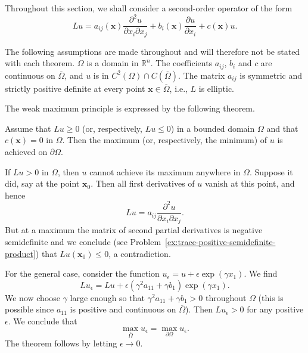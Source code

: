 Throughout this section, we shall consider a second-order operator of the form
\begin{equation}\label{eq:elliptic-second-order-operator}
Lu=a_{ij}(\bm{x})\dfrac{\partial^2u}{\partial x_i\partial x_j}+b_i(\bm{x})\dfrac{\partial u}{\partial x_i}+c(\bm{x})u.
\end{equation}


The following assumptions are made throughout and will therefore not be stated with each theorem. $\Omega$ is a domain in $\mathbb{R}^n$. The coefficients $a_{ij}$, $b_i$ and $c$ are continuous on $\overline\Omega$, and $u$ is in $C^2(\Omega)\cap C(\overline\Omega)$. The matrix $a_{ij}$ is symmetric and strictly positive definite at every point $\bm{x}\in\overline\Omega$, i.e., $L$ is elliptic.

The weak maximum principle is expressed by the following theorem.

\begin{Theorem}
\label{thm:weak-maximum-principle}
Assume that $Lu\geq0$ (or, respectively, $Lu\leq0$) in a bounded domain $\Omega$ and that $c(\bm{x})=0$ in $\Omega$. Then the maximum (or, respectively, the minimum) of $u$ is achieved on $\partial\Omega$.
\end{Theorem}

\begin{Proof}
If $Lu>0$ in $\Omega$, then $u$ cannot achieve its maximum anywhere in $\Omega$. Suppose it did, say at the point $\bm{x}_0$. Then all first derivatives of $u$ vanish at this point, and hence
\begin{equation}\label{eq:elliptic-operator-at-critical-point}
Lu=a_{ij}\dfrac{\partial^2u}{\partial x_i\partial x_j}.
\end{equation}
But at a maximum the matrix of second partial derivatives is negative semidefinite and we conclude (see Problem~\ref{ex:trace-positive-semidefinite-product}) that $Lu(\bm{x}_0)\leq0$, a contradiction.

For the general case, consider the function $u_\epsilon=u+\epsilon\exp(\gamma x_1)$. We find
\begin{equation}\label{eq:weak-maximum-exponential-perturbation}
Lu_\epsilon=Lu+\epsilon(\gamma^2a_{11}+\gamma b_1)\exp(\gamma x_1).
\end{equation}
We now choose $\gamma$ large enough so that $\gamma^2a_{11}+\gamma b_1>0$ throughout $\Omega$ (this is possible since $a_{11}$ is positive and continuous on $\overline\Omega$). Then $Lu_\epsilon>0$ for any positive $\epsilon$. We conclude that
\begin{equation}\label{eq:weak-maximum-perturbed-boundary-equality}
\max_{\overline\Omega}u_\epsilon=\max_{\partial\Omega}u_\epsilon.
\end{equation}
The theorem follows by letting $\epsilon\to0$.
\end{Proof}

